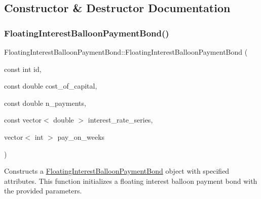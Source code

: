 \subsection{Constructor \& Destructor Documentation}
\mbox{\label{classFloatingInterestBalloonPaymentBond_aa42f50447a3dd1bd6959e8c4bd0c2421}} 
\subsubsection{\texorpdfstring{Floating\+Interest\+Balloon\+Payment\+Bond()}{FloatingInterestBalloonPaymentBond()}\hspace{0.1cm}{\footnotesize\ttfamily [1/2]}}
{\footnotesize\ttfamily Floating\+Interest\+Balloon\+Payment\+Bond\+::\+Floating\+Interest\+Balloon\+Payment\+Bond (\begin{DoxyParamCaption}\item[{const int}]{id,  }\item[{const double}]{cost\+\_\+of\+\_\+capital,  }\item[{const double}]{n\+\_\+payments,  }\item[{const vector$<$ double $>$}]{interest\+\_\+rate\+\_\+series,  }\item[{vector$<$ int $>$}]{pay\+\_\+on\+\_\+weeks }\end{DoxyParamCaption})}



Constructs a \mbox{\hyperlink{classFloatingInterestBalloonPaymentBond}{Floating\+Interest\+Balloon\+Payment\+Bond}} object with specified attributes. This function initializes a floating interest balloon payment bond with the provided parameters. 


